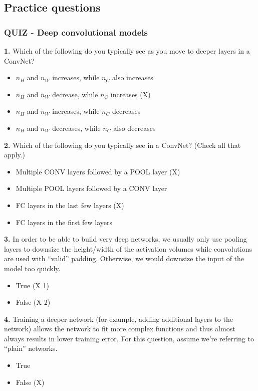\subsection{Practice questions}

\subsubsection{QUIZ - Deep convolutional models}
\textbf{1.} Which of the following do you typically see as you move to deeper layers in a ConvNet?
\begin{itemize}
    \item $n_H$ and $n_W$ increases, while $n_C$ also increases
    \item $n_H$ and $n_W$ decrease, while $n_C$ increases (X)
    \item $n_H$ and $n_W$ increases, while $n_C$ decreases
    \item $n_H$ and $n_W$ decreases, while $n_C$ also decreases
\end{itemize}
\textbf{2.} Which of the following do you typically see in a ConvNet? (Check all that apply.)
\begin{itemize}
    \item Multiple CONV layers followed by a POOL layer (X)
    \item Multiple POOL layers followed by a CONV layer
    \item FC layers in the last few layers (X)
    \item FC layers in the first few layers
\end{itemize}
\textbf{3.} In order to be able to build very deep networks, we usually only use pooling layers to downsize the height/width of the activation volumes while convolutions are used with “valid” padding. Otherwise, we would downsize the input of the model too quickly.
\begin{itemize}
    \item True (X 1)
    \item False (X 2)
\end{itemize}
\textbf{4.} Training a deeper network (for example, adding additional layers to the network) allows the network to fit more complex functions and thus almost always results in lower training error. For this question, assume we’re referring to “plain” networks.
\begin{itemize}
    \item True
    \item False (X)
\end{itemize}
